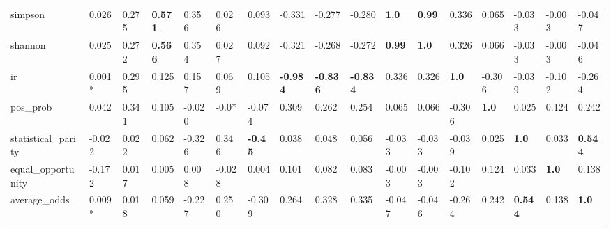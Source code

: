 \begin{tabular}{lllllllllllllllll}
simpson & 0.026 & 0.275 & \cellcolor{black!25}\textbf{0.571} & 0.356 & 0.026 & 0.093 & -0.331 & -0.277 & -0.280 & \cellcolor{black!25}\textbf{1.0} & \cellcolor{black!25}\textbf{0.99} & 0.336 & 0.065 & -0.033 & -0.003 & -0.047 \\
shannon & 0.025 & 0.272 & \cellcolor{black!25}\textbf{0.566} & 0.354 & 0.027 & 0.092 & -0.321 & -0.268 & -0.272 & \cellcolor{black!25}\textbf{0.99} & \cellcolor{black!25}\textbf{1.0} & 0.326 & 0.066 & -0.033 & -0.003 & -0.046 \\
ir & 0.001* & 0.295 & 0.125 & 0.157 & 0.069 & 0.105 & \cellcolor{black!25}\textbf{-0.984} & \cellcolor{black!25}\textbf{-0.836} & \cellcolor{black!25}\textbf{-0.834} & 0.336 & 0.326 & \cellcolor{black!25}\textbf{1.0} & -0.306 & -0.039 & -0.102 & -0.264 \\
pos_prob & 0.042 & 0.341 & 0.105 & -0.020 & -0.0* & -0.074 & 0.309 & 0.262 & 0.254 & 0.065 & 0.066 & -0.306 & \cellcolor{black!25}\textbf{1.0} & 0.025 & 0.124 & 0.242 \\
statistical_parity & -0.022 & 0.022 & 0.062 & -0.326 & 0.346 & \cellcolor{black!25}\textbf{-0.45} & 0.038 & 0.048 & 0.056 & -0.033 & -0.033 & -0.039 & 0.025 & \cellcolor{black!25}\textbf{1.0} & 0.033 & \cellcolor{black!25}\textbf{0.544} \\
equal_opportunity & -0.172 & 0.017 & 0.005 & 0.008 & -0.028 & 0.004 & 0.101 & 0.082 & 0.083 & -0.003 & -0.003 & -0.102 & 0.124 & 0.033 & \cellcolor{black!25}\textbf{1.0} & 0.138 \\
average_odds & 0.009* & 0.018 & 0.059 & -0.227 & 0.250 & -0.309 & 0.264 & 0.328 & 0.335 & -0.047 & -0.046 & -0.264 & 0.242 & \cellcolor{black!25}\textbf{0.544} & 0.138 & \cellcolor{black!25}\textbf{1.0} \\
\bottomrule
\end{tabular}
